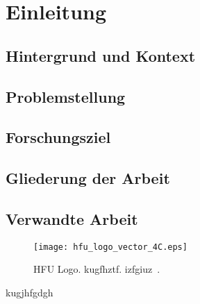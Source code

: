 \chapter{Einleitung}
\section{Hintergrund und Kontext}
\section{Problemstellung}
\section{Forschungsziel}
\section{Gliederung der Arbeit}
\section{Verwandte Arbeit}
\begin{figure}[htbp]  %
    \centering      %
    \texttt{[image: hfu\_logo\_vector\_4C.eps]}
    \caption{
        HFU Logo.
        kugfhztf.
        izfgiuz~\cite{oneil_star_2009}.
    }      %
    \label{pic:hfu_logo}    %
\end{figure}

kugjhfgdgh


